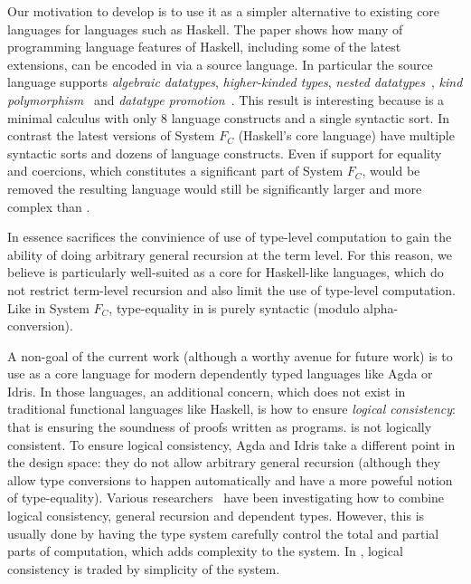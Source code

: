 Our motivation to develop \name is to use it as a simpler alternative
to existing core languages for languages such as Haskell. 
The paper shows how many of programming language features of
Haskell, including some of the latest extensions, can be encoded in
\name via a source language. In particular the source language
supports \emph{algebraic datatypes}, \emph{higher-kinded types},
\emph{nested datatypes}~\cite{nesteddt}, \emph{kind polymorphism}~\cite{fc:pro} and
\emph{datatype promotion}~\cite{fc:pro}.  This result is interesting because
\name is a minimal calculus with only 8 language constructs and a
single syntactic sort. In contrast the latest versions of System
$F_{C}$ (Haskell's core language) have multiple syntactic sorts and
dozens of language constructs.  Even if support for equality and
coercions, which constitutes a significant part of System $F_{C}$,
would be removed the resulting language would still be significantly
larger and more complex than \name.

In essence \name sacrifices the convinience of use of type-level
computation to gain the ability of doing arbitrary general recursion
at the term level.  For this reason, we believe \name is particularly well-suited as a
core for Haskell-like languages, which do not restrict term-level
recursion and also limit the use of type-level computation.  Like in
System $F_{C}$, type-equality in \name is purely syntactic (modulo
alpha-conversion). 

A non-goal of the current work (although a worthy avenue for future
work) is to use \name as a core language for modern dependently typed
languages like Agda or Idris. In those languages, an additional
concern, which does not exist in traditional functional languages like
Haskell, is how to ensure
\emph{logical consistency}: that is ensuring the soundness of proofs
written as programs. \name is not logically consistent.  To ensure
logical consistency, Agda and Idris take a different point in the
design space: they do not allow arbitrary general recursion (although they allow
type conversions to happen automatically and have a more poweful
notion of type-equality).  Various
researchers~\cite{zombie:popl14,zombie:thesis}
have been investigating how to combine logical consistency, general
recursion and dependent types. However, this is usually done by having
the type system carefully control the total and partial parts of
computation, which adds complexity to the system. In \name,
logical consistency is traded by simplicity of the system.


